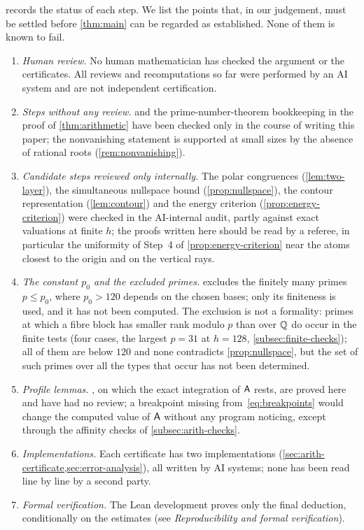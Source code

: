  records the status of each step. We list the points that, in our judgement,
must be settled before \cref{thm:main} can be regarded as established. None of them is known to
fail.
\begin{enumerate}[(O1)]
  \item \emph{Human review.} No human mathematician has checked the argument or the certificates.
  All reviews and recomputations so far were performed by an AI
  system and are not independent certification.
  \item \emph{Steps without any review.}  and the prime-number-theorem
  bookkeeping in the proof of \cref{thm:arithmetic} have been checked only in the course of
  writing this paper; the nonvanishing statement is supported at small sizes by the absence of
  rational roots (\cref{rem:nonvanishing}).
  \item \emph{Candidate steps reviewed only internally.} The polar congruences
  (\cref{lem:two-layer}), the simultaneous nullspace bound (\cref{prop:nullspace}), the contour
  representation (\cref{lem:contour}) and the energy criterion (\cref{prop:energy-criterion})
  were checked in the AI-internal audit, partly against exact valuations at finite $h$;
  the proofs written here should be read by a referee, in particular the uniformity of Step~4 of
  \cref{prop:energy-criterion} near the atoms closest to the origin and on the vertical rays.
  \item \emph{The constant $p_0$ and the excluded primes.}  excludes the
  finitely many primes $p\le p_0$, where $p_0>120$ depends on the chosen bases; only its
  finiteness is used, and it has not been computed. The exclusion is not a formality: primes at
  which a fibre block has smaller rank modulo $p$ than over $\mathbb{Q}$ do occur in the finite tests
  (four cases, the largest $p=31$ at $h=128$, \cref{subsec:finite-checks}); all of them are below
  $120$ and none contradicts \cref{prop:nullspace}, but the set of such primes over all the types
  that occur has not been determined.
  \item \emph{Profile lemmas.} , on which the exact
  integration of $\mathsf{A}$ rests, are proved here and have had no review; a breakpoint missing
  from~\eqref{eq:breakpoints} would change the computed value of $\mathsf{A}$ without any program
  noticing, except through the affinity checks of \cref{subsec:arith-checks}.
  \item \emph{Implementations.} Each certificate has two implementations (\cref{sec:arith-certificate,sec:error-analysis}),
  all written by AI systems; none has been read line by line by a second party.
  \item \emph{Formal verification.} The Lean development proves only the final deduction,
  conditionally on the estimates (see \emph{Reproducibility and formal verification}).
\end{enumerate}
